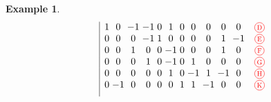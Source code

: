 \documentclass{amsart}
\theoremstyle{definition}
\newtheorem{example}[theorem]{Example}
\newcommand{\red}{\color{red}} %
\newcommand*\circled[1]{\tikz[baseline=(char.base)]{\node[shape=circle, draw, inner sep=1.5pt, scale=.7] (char) {#1};}}
\begin{document}
\begin{example}
\[\begin{array}{r|c@{\;}c@{\;}c@{\;}c@{\;}c@{\;}c@{\;}c@{\;}c@{\;}c@{\;}c@{\;}cc}
					& 1 & 0 & -1 & -1 & 0 & 1 & 0 & 0 & 0 & 0 & 0 & \red \circled{D} \\
					& 0 & 0 & 0 & -1 & 1 & 0 & 0 & 0 & 0 & 1 & -1 & \red \circled{E} \\
					& 0 & 0 & 1 & 0 & 0 & -1 & 0 & 0 & 0 & 1 & 0 & \red \circled{F}\\
					& 0 & 0 & 0 & 1 & 0 & -1 & 0 & 1 & 0 & 0 & 0 & \red \circled{G} \\
					& 0 & 0 & 0 & 0 & 0 & 1 & 0 & -1 & 1 & -1 & 0 & \red \circled{H} \\
					& 0 & -1 & 0 & 0 & 0 & 0 & 1 & 1 & -1 & 0 & 0 & \red \circled{K} \\[.2cm]
\end{array}
\]

%
%


\end{example}
\end{document}
